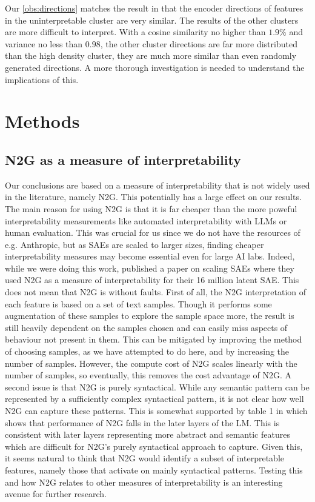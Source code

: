 Our \ref{obs:directions} matches the result in \textcite{nanda_open_2023} that the encoder directions of features in the uninterpretable cluster are very similar.
The results of the other clusters are more difficult to interpret.
With a cosine similarity no higher than $1.9\%$ and variance no less than $0.98$, the other cluster directions are far more distributed than the high density cluster, they are much more similar than even randomly generated directions.
A more thorough investigation is needed to understand the implications of this.



\section{Methods}
\subsection{N2G as a measure of interpretability}
\label{sec:n2g_interpretability}
Our conclusions are based on a measure of interpretability that is not widely used in the literature, namely N2G.
This potentially has a large effect on our results.
The main reason for using N2G is that it is far cheaper than the more poweful interpretability measurements like automated interpretability with LLMs or human evaluation.
This was crucial for us since we do not have the resources of e.g. Anthropic, but as SAEs are scaled to larger sizes, finding cheaper interpretability measures may become essential even for large AI labs.
Indeed, while we were doing this work, \textcite{gao_scaling_2024} published a paper on scaling SAEs where they used N2G as a measure of interpretability for their 16 million latent SAE.
This does not mean that N2G is without faults.
First of all, the N2G interpretation of each feature is based on a set of text samples.
Though it performs some augmentation of these samples to explore the sample space more, the result is still heavily dependent on the samples chosen and can easily miss aspects of behaviour not present in them.
This can be mitigated by improving the method of choosing samples, as we have attempted to do here, and by increasing the number of samples.
However, the compute cost of N2G scales linearly with the number of samples, so eventually, this removes the cost advantage of N2G.
A second issue is that N2G is purely syntactical.
While any semantic pattern can be represented by a sufficiently complex syntactical pattern, it is not clear how well N2G can capture these patterns.
This is somewhat supported by table 1 in \textcite{foote_neuron_2023} which shows that performance of N2G falls in the later layers of the LM.
This is consistent with later layers representing more abstract and semantic features which are difficult for N2G's purely syntactical approach to capture.
Given this, it seems natural to think that N2G would identify a subset of interpretable features, namely those that activate on mainly syntactical patterns.
Testing this and how N2G relates to other measures of interpretability is an interesting avenue for further research.

